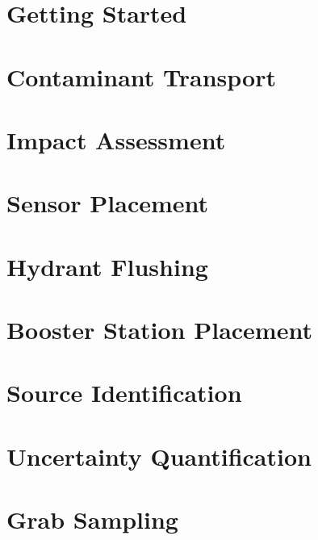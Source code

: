 \documentclass[pdf,oneside]{book}
\begin{document}
  \chapter{Getting Started}
  \label{chap:gettingstarted}
  



  \chapter{Contaminant Transport}
  \label{chap:tevasim}
  

  \chapter{Impact Assessment}
  \label{chap:sim2Impact}
  

  \chapter{Sensor Placement}
  \label{chap:sp}
  

  \chapter{Hydrant Flushing}
  \label{chap:flush}
  

  \chapter{Booster Station Placement}
  \label{chap:booster}
  

  \chapter{Source Identification}
  \label{chap:inversion}
  
  
  \chapter{Uncertainty Quantification}
  \label{chap:uq}
  

  \chapter{Grab Sampling}
  \label{chap:grabsample}
  
\end{document}
